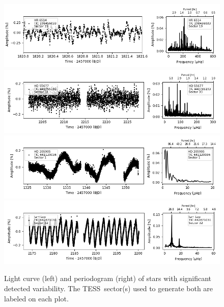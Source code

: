\documentclass[twocolumn]{aastex631}
\newcommand{\tess}{TESS}
\begin{document}
\begin{figure}
\centering
    \includegraphics[width=0.9\linewidth]{figures/tic00000198456033_s019_norm1.fits}
    \includegraphics[width=0.9\linewidth]{figures/tic00000440765193_s033_flat1.fits.png}
    \includegraphics[width=0.9\linewidth]{figures/tic00000441120034_s001_normH.fits.png}
    \includegraphics[width=0.9\linewidth]{figures/tic00000442871031_s032_norm1.fits.png}

    \caption{Light curve (left) and periodogram (right) of stars with significant detected variability. The \tess\ sector(s) used to generate both are labeled on each plot.}
    \label{fig:lcft2}
\end{figure}
\end{document}
